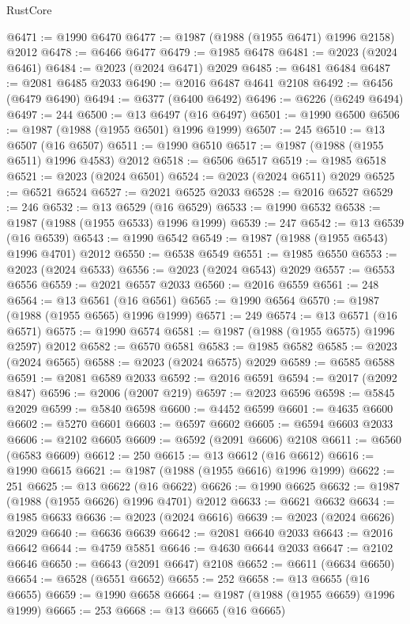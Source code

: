 \begin{lexlean}{RustCore}
\begin{coremodule}
@6471 := @1990 @6470
@6477 := @1987 (@1988 (@1955 @6471) @1996 @2158) @2012
@6478 := @6466 @6477
@6479 := @1985 @6478
@6481 := @2023 (@2024 @6461)
@6484 := @2023 (@2024 @6471) @2029
@6485 := @6481 @6484
@6487 := @2081 @6485 @2033
@6490 := @2016 @6487 @4641 @2108
@6492 := @6456 (@6479 @6490)
@6494 := @6377 (@6400 @6492)
@6496 := @6226 (@6249 @6494)
@6497 := 244
@6500 := @13 @6497 (@16 @6497)
@6501 := @1990 @6500
@6506 := @1987 (@1988 (@1955 @6501) @1996 @1999)
@6507 := 245
@6510 := @13 @6507 (@16 @6507)
@6511 := @1990 @6510
@6517 := @1987 (@1988 (@1955 @6511) @1996 @4583) @2012
@6518 := @6506 @6517
@6519 := @1985 @6518
@6521 := @2023 (@2024 @6501)
@6524 := @2023 (@2024 @6511) @2029
@6525 := @6521 @6524
@6527 := @2021 @6525 @2033
@6528 := @2016 @6527
@6529 := 246
@6532 := @13 @6529 (@16 @6529)
@6533 := @1990 @6532
@6538 := @1987 (@1988 (@1955 @6533) @1996 @1999)
@6539 := 247
@6542 := @13 @6539 (@16 @6539)
@6543 := @1990 @6542
@6549 := @1987 (@1988 (@1955 @6543) @1996 @4701) @2012
@6550 := @6538 @6549
@6551 := @1985 @6550
@6553 := @2023 (@2024 @6533)
@6556 := @2023 (@2024 @6543) @2029
@6557 := @6553 @6556
@6559 := @2021 @6557 @2033
@6560 := @2016 @6559
@6561 := 248
@6564 := @13 @6561 (@16 @6561)
@6565 := @1990 @6564
@6570 := @1987 (@1988 (@1955 @6565) @1996 @1999)
@6571 := 249
@6574 := @13 @6571 (@16 @6571)
@6575 := @1990 @6574
@6581 := @1987 (@1988 (@1955 @6575) @1996 @2597) @2012
@6582 := @6570 @6581
@6583 := @1985 @6582
@6585 := @2023 (@2024 @6565)
@6588 := @2023 (@2024 @6575) @2029
@6589 := @6585 @6588
@6591 := @2081 @6589 @2033
@6592 := @2016 @6591
@6594 := @2017 (@2092 @847)
@6596 := @2006 (@2007 @219)
@6597 := @2023 @6596
@6598 := @5845 @2029
@6599 := @5840 @6598
@6600 := @4452 @6599
@6601 := @4635 @6600
@6602 := @5270 @6601
@6603 := @6597 @6602
@6605 := @6594 @6603 @2033
@6606 := @2102 @6605
@6609 := @6592 (@2091 @6606) @2108
@6611 := @6560 (@6583 @6609)
@6612 := 250
@6615 := @13 @6612 (@16 @6612)
@6616 := @1990 @6615
@6621 := @1987 (@1988 (@1955 @6616) @1996 @1999)
@6622 := 251
@6625 := @13 @6622 (@16 @6622)
@6626 := @1990 @6625
@6632 := @1987 (@1988 (@1955 @6626) @1996 @4701) @2012
@6633 := @6621 @6632
@6634 := @1985 @6633
@6636 := @2023 (@2024 @6616)
@6639 := @2023 (@2024 @6626) @2029
@6640 := @6636 @6639
@6642 := @2081 @6640 @2033
@6643 := @2016 @6642
@6644 := @4759 @5851
@6646 := @4630 @6644 @2033
@6647 := @2102 @6646
@6650 := @6643 (@2091 @6647) @2108
@6652 := @6611 (@6634 @6650)
@6654 := @6528 (@6551 @6652)
@6655 := 252
@6658 := @13 @6655 (@16 @6655)
@6659 := @1990 @6658
@6664 := @1987 (@1988 (@1955 @6659) @1996 @1999)
@6665 := 253
@6668 := @13 @6665 (@16 @6665)

\end{coremodule}
\end{lexlean}
